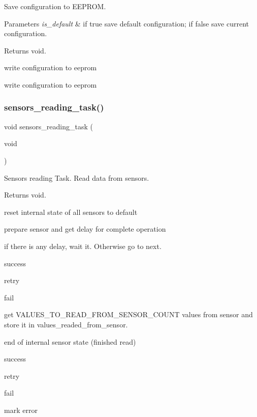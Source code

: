 Save configuration to E\+E\+P\+R\+OM. 


\begin{DoxyParams}{Parameters}
{\em is\+\_\+default} & if true save default configuration; if false save current configuration. \\
\hline
\end{DoxyParams}
\begin{DoxyReturn}{Returns}
void. 
\end{DoxyReturn}
write configuration to eeprom

write configuration to eeprom \mbox{\label{i2c-th_8h_af0e8965583b124096972fe3a9e0e7954}} 
\subsubsection{\texorpdfstring{sensors\+\_\+reading\+\_\+task()}{sensors\_reading\_task()}}
{\footnotesize\ttfamily void sensors\+\_\+reading\+\_\+task (\begin{DoxyParamCaption}\item[{void}]{ }\end{DoxyParamCaption})}



Sensors reading Task. Read data from sensors. 

\begin{DoxyReturn}{Returns}
void. 
\end{DoxyReturn}
reset internal state of all sensors to default

prepare sensor and get delay for complete operation

if there is any delay, wait it. Otherwise go to next.

success

retry

fail

get V\+A\+L\+U\+E\+S\+\_\+\+T\+O\+\_\+\+R\+E\+A\+D\+\_\+\+F\+R\+O\+M\+\_\+\+S\+E\+N\+S\+O\+R\+\_\+\+C\+O\+U\+NT values from sensor and store it in values\+\_\+readed\+\_\+from\+\_\+sensor.

end of internal sensor state (finished read)

success

retry

fail

mark error

